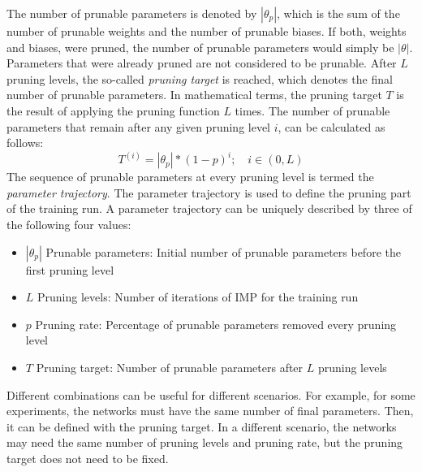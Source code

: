 The number of prunable parameters is denoted by $|\theta_p|$, which is the sum of the number of prunable weights and the number of prunable biases.
If both, weights and biases, were pruned, the number of prunable parameters would simply be $|\theta|$.
Parameters that were already pruned are not considered to be prunable.
After $L$ pruning levels, the so-called \textit{pruning target} is reached, which denotes the final number of prunable parameters.
In mathematical terms, the pruning target $T$ is the result of applying the pruning function $L$ times.
The number of prunable parameters that remain after any given pruning level $i$, can be calculated as follows:
\[ T^{(i)} = |\theta_p| * {(1-p)}^i ; \quad i \in (0,L) \]
The sequence of prunable parameters at every pruning level is termed the \textit{parameter trajectory}.
The parameter trajectory is used to define the pruning part of the training run.
A parameter trajectory can be uniquely described by three of the following four values:
\begin{itemize}
    \item $|\theta_p|$ Prunable parameters: Initial number of prunable parameters before the first pruning level
    \item $L$ Pruning levels: Number of iterations of IMP for the training run
    \item $p$ Pruning rate: Percentage of prunable parameters removed every pruning level
    \item $T$ Pruning target: Number of prunable parameters after $L$ pruning levels
\end{itemize}
Different combinations can be useful for different scenarios.
For example, for some experiments, the networks must have the same number of final parameters.
Then, it can be defined with the pruning target.
In a different scenario, the networks may need the same number of pruning levels and pruning rate, but the pruning target does not need to be fixed.


